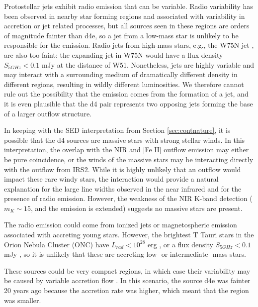Protostellar jets exhibit radio emission that can be variable.  Radio
variability has been observed in nearby star forming regions
\citep{Liu2014c,Forbrich2013a} and associated with variability in accretion or
jet related processes, but all sources seen in these regions are orders of
magnitude fainter than d4e, so a jet from a low-mass star is unlikely to be
responsible for the emission.  Radio jets from high-mass stars, e.g., the W75N
jet \citep{Carrasco-Gonzalez2015a}, are also too faint: the expanding jet in
W75N would have a flux density $S_{5 GHz} < 0.1$ mJy at the distance of W51.
Nonetheless, jets are highly variable and may interact with a surrounding
medium of dramatically different density in different regions, resulting in
wildly different luminosities.  We therefore cannot rule out the possibility
that the emission comes from the formation of a jet, and it is even plausible
that the d4 pair represents two opposing jets forming the base of a larger
outflow structure.

In keeping with the SED interpretation from Section \ref{sec:contnature}, it is
possible that the d4 sources are massive stars with strong stellar winds.  In
this interpretation, the overlap with the NIR \hh and [Fe II] outflow emission
\citep[Figure \ref{fig:d4h2}][]{Hodapp2002a} may either be pure
coincidence, or the winds of the massive stars may be interacting directly with
the outflow from IRS2.  While it is highly unlikely that an outflow would
impact these rare windy stars, the interaction would provide a natural
explanation for the large line widths observed in the near infrared and for the
presence of radio emission.  However, the weakness of the NIR K-band detection
($m_K \sim 15$, and the emission is extended) suggests no massive stars are
present.

The radio emission could come from ionized jets or magnetospheric emission
associated with accreting young stars.  However, the brightest T Tauri stars in the
Orion Nebula Cluster (ONC) have $L_{rad}<10^{28}$ erg \pers, or a flux density
$S_{5 GHz} < 0.1$ mJy \citep{Forbrich2013a,Zapata2004a}, so it is unlikely that
these are accreting low- or intermediate- mass stars.  

These sources could be very compact \hchii regions, in which case their
variability may be caused by variable accretion flow
\citep{Peters2010c,Galvan-Madrid2011d,de-Pree2014a}.  In this scenario, the
source d4e was fainter 20 years ago because the accretion rate was higher,
which meant that the \hchii region was smaller.

